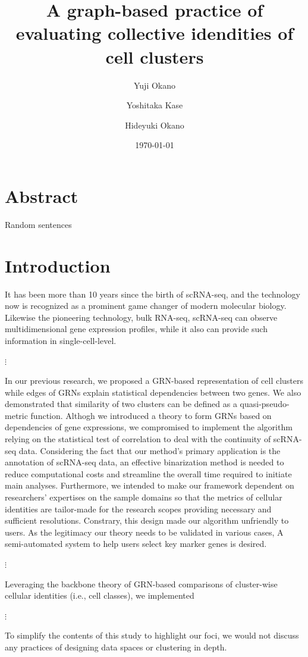 \documentclass{article}
\title{
  A graph-based practice of evaluating collective idendities of cell clusters
}
\author[1,2]{Yuji Okano}
\author[2]{Yoshitaka Kase}
\author[2]{Hideyuki Okano}
\affil[1]{
  Department of Extended Intelligence for Medicine, 
  The Ishii-Ishibashi Laboratory, 
  Keio University School of Medicine
}
\affil[2]{
  Division of CNS Regeneration and Drug Discovery,
  International Center for Brain Science, 
  Fujita Health University
}
\date{\today}
\begin{document}
\maketitle

\section*{Abstract}
Random sentences

\section*{Introduction}
It has been more than 10 years since the birth of \ac{scRNA-seq}, and the technology 
now is recognized as a prominent game changer of modern molecular biology. Likewise the pioneering technology, 
bulk RNA-seq,
scRNA-seq can observe multidimensional gene expression profiles, while
it also can provide such information in single-cell-level.

$\vdots$

In our previous research, we proposed a \ac{GRN}-based
representation of cell clusters while edges of GRNs explain statistical
dependencies between two genes\cite{okano2023set}. We also demonstrated that similarity of
two clusters can be defined as a quasi-pseudo-metric function\cite{okano2023set}. Althogh we
introduced a theory to form GRNs based on dependencies of gene expressions, 
we compromised to implement the algorithm relying on the statistical test of 
correlation to deal with the continuity of scRNA-seq data. Considering the fact that 
our method's primary application is the annotation of scRNA-seq data, 
an effective binarization method is needed to reduce computational costs and 
streamline the overall time required to initiate main analyses. Furthermore, we 
intended to make our framework dependent on researchers' expertises on the 
sample domains so that the metrics of cellular identities are tailor-made for the 
research scopes providing necessary and sufficient resolutions. Constrary, this 
design made our algorithm unfriendly to users. As the legitimacy our theory 
needs to be validated in various cases, A semi-automated system to help users 
select key marker genes is desired.

$\vdots$

Leveraging the backbone theory of GRN-based comparisons of cluster-wise
cellular identities (i.e., cell classes), we implemented 

$\vdots$

To simplify the contents of this study to highlight our foci, we would not 
discuss any practices of designing data spaces or clustering in depth.
\end{document}
